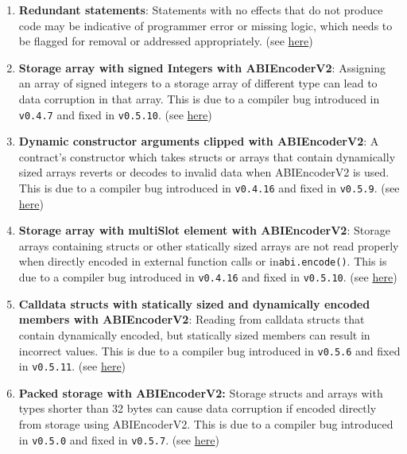 \begin{enumerate}
\item\textbf{Redundant statements}: Statements with no effects that do not produce code may be indicative of programmer error or missing logic, which needs to be flagged for removal or addressed appropriately. (see \href{https://swcregistry.io/docs/SWC-135}{here})

\item\textbf{Storage array with signed Integers with ABIEncoderV2}: Assigning an array of signed integers to a storage array of different type can lead to data corruption in that array. This is due to a compiler bug introduced in \verb|v0.4.7| and fixed in \verb|v0.5.10|. (see \href{https://docs.soliditylang.org/en/v0.8.9/bugs.html}{here})

\item\textbf{Dynamic constructor arguments clipped with ABIEncoderV2}: A contract's constructor which takes structs or arrays that contain dynamically sized arrays reverts or decodes to invalid data when ABIEncoderV2 is used. This is due to a compiler bug introduced in \verb|v0.4.16| and fixed in \verb|v0.5.9|. (see \href{https://docs.soliditylang.org/en/v0.8.9/bugs.html}{here})

\item\textbf{Storage array with multiSlot element with ABIEncoderV2}: Storage arrays containing structs or other statically sized arrays are not read properly when directly encoded in external function calls or in\linebreak\verb|abi.encode()|. This is due to a compiler bug introduced in \verb|v0.4.16| and fixed in \verb|v0.5.10|. (see \href{https://docs.soliditylang.org/en/v0.8.9/bugs.html}{here})

\item\textbf{Calldata structs with statically sized and dynamically encoded members with ABIEncoderV2}: Reading from calldata structs that contain dynamically encoded, but statically sized members can result in incorrect values. This is due to a compiler bug introduced in \verb|v0.5.6| and fixed in \verb|v0.5.11|. (see \href{https://docs.soliditylang.org/en/v0.8.9/bugs.html}{here})

\item\textbf{Packed storage with ABIEncoderV2: }Storage structs and arrays with types shorter than 32 bytes can cause data corruption if encoded directly from storage using ABIEncoderV2. This is due to a compiler bug introduced in \verb|v0.5.0| and fixed in \verb|v0.5.7|. (see \href{https://docs.soliditylang.org/en/v0.8.9/bugs.html}{here})


\end{enumerate}
